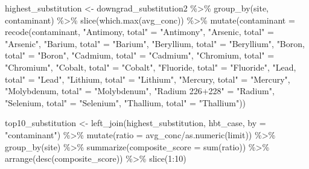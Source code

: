 \documentclass[12pt, twoside]{amherstthesis}
\newenvironment{Shaded}{\begin{snugshade}}{\end{snugshade}}
\newcommand{\AttributeTok}[1]{\textcolor[rgb]{0.77,0.63,0.00}{#1}}
\newcommand{\DecValTok}[1]{\textcolor[rgb]{0.00,0.00,0.81}{#1}}
\newcommand{\FunctionTok}[1]{\textcolor[rgb]{0.00,0.00,0.00}{#1}}
\newcommand{\NormalTok}[1]{#1}
\newcommand{\OtherTok}[1]{\textcolor[rgb]{0.56,0.35,0.01}{#1}}
\newcommand{\SpecialCharTok}[1]{\textcolor[rgb]{0.00,0.00,0.00}{#1}}
\newcommand{\StringTok}[1]{\textcolor[rgb]{0.31,0.60,0.02}{#1}}
\begin{document}
\begin{Shaded}
\begin{Highlighting}[]
\NormalTok{highest\_substitution }\OtherTok{\textless{}{-}}\NormalTok{ downgrad\_substitution2 }\SpecialCharTok{\%\textgreater{}\%}
  \FunctionTok{group\_by}\NormalTok{(site, contaminant) }\SpecialCharTok{\%\textgreater{}\%}
  \FunctionTok{slice}\NormalTok{(}\FunctionTok{which.max}\NormalTok{(avg\_conc)) }\SpecialCharTok{\%\textgreater{}\%}
  \FunctionTok{mutate}\NormalTok{(}\AttributeTok{contaminant =} \FunctionTok{recode}\NormalTok{(contaminant,}
                              \StringTok{"Antimony, total"} \OtherTok{=} \StringTok{"Antimony"}\NormalTok{,}
                              \StringTok{"Arsenic, total"} \OtherTok{=} \StringTok{"Arsenic"}\NormalTok{,}
                              \StringTok{"Barium, total"} \OtherTok{=} \StringTok{"Barium"}\NormalTok{,}
                              \StringTok{"Beryllium, total"} \OtherTok{=} \StringTok{"Beryllium"}\NormalTok{,}
                              \StringTok{"Boron, total"} \OtherTok{=} \StringTok{"Boron"}\NormalTok{,}
                              \StringTok{"Cadmium, total"} \OtherTok{=} \StringTok{"Cadmium"}\NormalTok{,}
                              \StringTok{"Chromium, total"} \OtherTok{=} \StringTok{"Chromium"}\NormalTok{,}
                              \StringTok{"Cobalt, total"} \OtherTok{=} \StringTok{"Cobalt"}\NormalTok{,}
                              \StringTok{"Fluoride, total"} \OtherTok{=} \StringTok{"Fluoride"}\NormalTok{,}
                              \StringTok{"Lead, total"} \OtherTok{=} \StringTok{"Lead"}\NormalTok{,}
                              \StringTok{"Lithium, total"} \OtherTok{=} \StringTok{"Lithium"}\NormalTok{,}
                              \StringTok{"Mercury, total"} \OtherTok{=} \StringTok{"Mercury"}\NormalTok{,}
                              \StringTok{"Molybdenum, total"} \OtherTok{=} \StringTok{"Molybdenum"}\NormalTok{,}
                              \StringTok{"Radium 226+228"} \OtherTok{=} \StringTok{"Radium"}\NormalTok{,}
                              \StringTok{"Selenium, total"} \OtherTok{=} \StringTok{"Selenium"}\NormalTok{,}
                              \StringTok{"Thallium, total"} \OtherTok{=} \StringTok{"Thallium"}\NormalTok{))}

\NormalTok{top10\_substitution }\OtherTok{\textless{}{-}} \FunctionTok{left\_join}\NormalTok{(highest\_substitution, }
\NormalTok{                                hbt\_case, }\AttributeTok{by =} \StringTok{"contaminant"}\NormalTok{) }\SpecialCharTok{\%\textgreater{}\%}
  \FunctionTok{mutate}\NormalTok{(}\AttributeTok{ratio =}\NormalTok{ avg\_conc}\SpecialCharTok{/}\FunctionTok{as.numeric}\NormalTok{(limit)) }\SpecialCharTok{\%\textgreater{}\%} 
  \FunctionTok{group\_by}\NormalTok{(site) }\SpecialCharTok{\%\textgreater{}\%}
  \FunctionTok{summarize}\NormalTok{(}\AttributeTok{composite\_score =} \FunctionTok{sum}\NormalTok{(ratio)) }\SpecialCharTok{\%\textgreater{}\%} 
  \FunctionTok{arrange}\NormalTok{(}\FunctionTok{desc}\NormalTok{(composite\_score)) }\SpecialCharTok{\%\textgreater{}\%}
  \FunctionTok{slice}\NormalTok{(}\DecValTok{1}\SpecialCharTok{:}\DecValTok{10}\NormalTok{)}
\end{Highlighting}
\end{Shaded}
\end{document}
